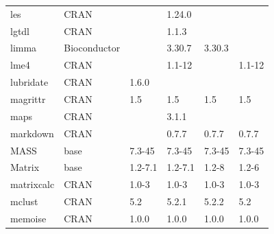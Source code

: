 \begin{longtable}{llllll}
\rowcolor{black!10}
les                           & \acrshort{CRAN}                      &             & 1.24.0      &                &                   \\
\rowcolor{black!5}
lgtdl                         & \acrshort{CRAN}                      &             & 1.1.3       &                &                    \\
\rowcolor{black!10}
limma                         & Bioconductor              &             & 3.30.7      & 3.30.3         &                   \\
\rowcolor{black!5}
lme4                          & \acrshort{CRAN}                      &             & 1.1-12      &                & 1.1-12             \\
\rowcolor{black!10}
lubridate                     & \acrshort{CRAN}                      & 1.6.0       &             &                &                   \\
\rowcolor{black!5}
magrittr                      & \acrshort{CRAN}                      & 1.5         & 1.5         & 1.5            & 1.5                \\
\rowcolor{black!10}
maps                          & \acrshort{CRAN}                      &             & 3.1.1       &                &                   \\
\rowcolor{black!5}
markdown                      & \acrshort{CRAN}                      &             & 0.7.7       & 0.7.7          & 0.7.7              \\
\rowcolor{black!10}
MASS                          & base                      & 7.3-45      & 7.3-45      & 7.3-45         & 7.3-45            \\
\rowcolor{black!5}
Matrix                        & base                      & 1.2-7.1     & 1.2-7.1     & 1.2-8          & 1.2-6              \\
\rowcolor{black!10}
matrixcalc                    & \acrshort{CRAN}                      & 1.0-3       & 1.0-3       & 1.0-3          & 1.0-3             \\
\rowcolor{black!5}
mclust                        & \acrshort{CRAN}                      & 5.2         & 5.2.1       & 5.2.2          & 5.2                \\
\rowcolor{black!10}
memoise                       & \acrshort{CRAN}                      & 1.0.0       & 1.0.0       & 1.0.0          & 1.0.0             \\

\end{longtable}
